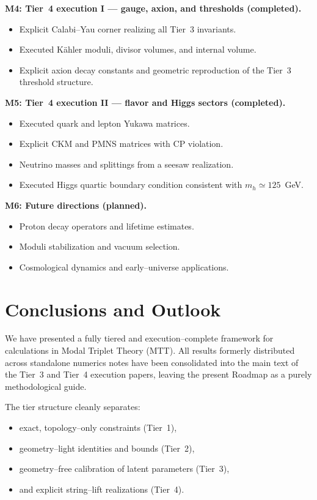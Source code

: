 \documentclass[11pt]{article}
\begin{document}
\noindent\textbf{M4: Tier~4 execution I --- gauge, axion, and thresholds
(completed).}
\begin{itemize}
  \item Explicit Calabi--Yau corner realizing all Tier~3 invariants.
  \item Executed K\"ahler moduli, divisor volumes, and internal volume.
  \item Explicit axion decay constants and geometric reproduction of the
        Tier~3 threshold structure.
\end{itemize}

\noindent\textbf{M5: Tier~4 execution II --- flavor and Higgs sectors
(completed).}
\begin{itemize}
  \item Executed quark and lepton Yukawa matrices.
  \item Explicit CKM and PMNS matrices with CP violation.
  \item Neutrino masses and splittings from a seesaw realization.
  \item Executed Higgs quartic boundary condition consistent with
        $m_h\simeq125$~GeV.
\end{itemize}

\noindent\textbf{M6: Future directions (planned).}
\begin{itemize}
  \item Proton decay operators and lifetime estimates.
  \item Moduli stabilization and vacuum selection.
  \item Cosmological dynamics and early--universe applications.
\end{itemize}


\section{Conclusions and Outlook}

We have presented a fully tiered and execution--complete framework for
calculations in Modal Triplet Theory (MTT).
All results formerly distributed across standalone numerics notes have
been consolidated into the main text of the Tier~3 and Tier~4 execution
papers, leaving the present Roadmap as a purely methodological guide.

The tier structure cleanly separates:
\begin{itemize}
  \item exact, topology--only constraints (Tier~1),
  \item geometry--light identities and bounds (Tier~2),
  \item geometry--free calibration of latent parameters (Tier~3),
  \item and explicit string--lift realizations (Tier~4).
\end{itemize}
\end{document}
